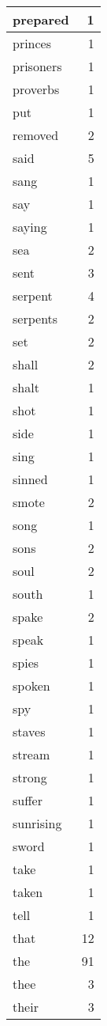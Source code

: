 \begin{center}
\begin{longtable}{l|r}
prepared & 1 \\ \hline
princes & 1 \\ \hline
prisoners & 1 \\ \hline
proverbs & 1 \\ \hline
put & 1 \\ \hline
removed & 2 \\ \hline
said & 5 \\ \hline
sang & 1 \\ \hline
say & 1 \\ \hline
saying & 1 \\ \hline
sea & 2 \\ \hline
sent & 3 \\ \hline
serpent & 4 \\ \hline
serpents & 2 \\ \hline
set & 2 \\ \hline
shall & 2 \\ \hline
shalt & 1 \\ \hline
shot & 1 \\ \hline
side & 1 \\ \hline
sing & 1 \\ \hline
sinned & 1 \\ \hline
smote & 2 \\ \hline
song & 1 \\ \hline
sons & 2 \\ \hline
soul & 2 \\ \hline
south & 1 \\ \hline
spake & 2 \\ \hline
speak & 1 \\ \hline
spies & 1 \\ \hline
spoken & 1 \\ \hline
spy & 1 \\ \hline
staves & 1 \\ \hline
stream & 1 \\ \hline
strong & 1 \\ \hline
suffer & 1 \\ \hline
sunrising & 1 \\ \hline
sword & 1 \\ \hline
take & 1 \\ \hline
taken & 1 \\ \hline
tell & 1 \\ \hline
that & 12 \\ \hline
the & 91 \\ \hline
thee & 3 \\ \hline
their & 3 \\ \hline

\end{longtable}
\end{center}
